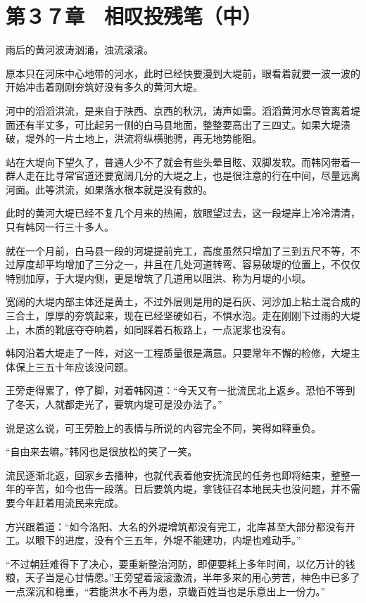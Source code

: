 \section{第３７章　相叹投残笔（中）}

雨后的黄河波涛汹涌，浊流滚滚。

原本只在河床中心地带的河水，此时已经快要漫到大堤前，眼看着就要一波一波的开始冲击着刚刚夯筑好没有多久的黄河大堤。

河中的滔滔洪流，是来自于陕西、京西的秋汛，涛声如雷。滔滔黄河水尽管离着堤面还有半丈多，可比起另一侧的白马县地面，整整要高出了三四丈。如果大堤溃破，堤外的一片土地上，洪流将纵横驰骋，再无地势能阻。

站在大堤向下望久了，普通人少不了就会有些头晕目眩、双脚发软。而韩冈带着一群人走在比寻常官道还要宽阔几分的大堤之上，也是很注意的行在中间，尽量远离河面。此等洪流，如果落水根本就是没有救的。

此时的黄河大堤已经不复几个月来的热闹，放眼望过去，这一段堤岸上冷冷清清，只有韩冈一行三十多人。

就在一个月前，白马县一段的河堤提前完工，高度虽然只增加了三到五尺不等，不过厚度却平均增加了三分之一，并且在几处河道转弯、容易破堤的位置上，不仅仅特别加厚，于大堤内侧，更是增筑了几道用以阻洪、称为月堤的小坝。

宽阔的大堤内部主体还是黄土，不过外层则是用的是石灰、河沙加上粘土混合成的三合土，厚厚的夯筑起来，现在已经坚硬如石，不惧水泡。走在刚刚下过雨的大堤上，木质的靴底夺夺响着，如同踩着石板路上，一点泥浆也没有。

韩冈沿着大堤走了一阵，对这一工程质量很是满意。只要常年不懈的检修，大堤主体保上三五十年应该没问题。

王旁走得累了，停了脚，对着韩冈道：“今天又有一批流民北上返乡。恐怕不等到了冬天，人就都走光了，要筑内堤可是没办法了。”

说是这么说，可王旁脸上的表情与所说的内容完全不同，笑得如释重负。

“自由来去嘛。”韩冈也是很放松的笑了一笑。

流民逐渐北返，回家乡去播种，也就代表着他安抚流民的任务也即将结束，整整一年的辛苦，如今也告一段落。日后要筑内堤，拿钱征召本地民夫也没问题，并不需要今年赶着用流民来完成。

方兴跟着道：“如今洛阳、大名的外堤增筑都没有完工，北岸甚至大部分都没有开工。以眼下的进度，没有个三五年，外堤不能建功，内堤也难动手。”

“不过朝廷难得下了决心，要重新整治河防，即便要耗上多年时间，以亿万计的钱粮，天子当是心甘情愿。”王旁望着滚滚激流，半年多来的用心劳苦，神色中已多了一点深沉和稳重，“若能洪水不再为患，京畿百姓当也是乐意出上一份力。”

